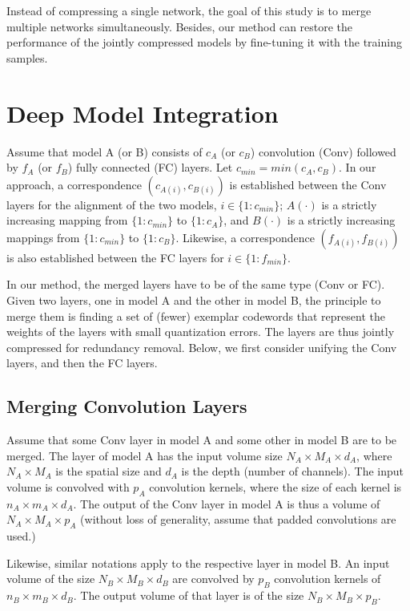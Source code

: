\documentclass{article}
\begin{document}
	
	Instead of compressing a single network, the goal of this study is to merge multiple networks simultaneously.
	Besides, our method can restore the performance of the jointly compressed models by fine-tuning it with the training samples.
	
	
	\section{Deep Model Integration}
	Assume that model A (or B) consists of $c_A$ (or $c_B$) convolution (Conv) followed by $f_A$ (or $f_B$) fully connected (FC) layers.
	Let $c_{min}=min(c_A,c_B)$.
	In our approach, a correspondence $(c_{A(i)},c_{B(i)})$ is established between the Conv layers for the alignment of the two models, $i \in \{1:c_{min}\}$; $A(\cdot)$ is a strictly increasing mapping from $\{1:c_{min}\}$ to $\{1:c_A\}$, and $B(\cdot)$ is a strictly increasing mappings from $\{1:c_{min}\}$ to $\{1:c_B\}$.
	Likewise, a correspondence $(f_{A(i)},f_{B(i)})$ is also established between the FC layers for $i \in \{1:f_{min}\}$.
	
	In our method, the merged layers have to be of the same type (Conv or FC).
	Given two layers, one in model A and the other in model B, the principle to merge them is finding a set of (fewer) exemplar codewords that represent the weights of the layers with small quantization errors.
	The layers are thus jointly compressed for redundancy removal.
	Below, we first consider unifying the Conv layers, and then the FC layers.
	
	\subsection{Merging Convolution Layers}
	
	Assume that some Conv layer in model A and some other in model B are to be merged.
	The layer of model A has the input volume size $N_A \times M_A \times d_A$, where $N_A\times M_A$ is the spatial size and $d_A$ is the depth (number of channels).
	The input volume is convolved with $p_A$ convolution kernels, where the size of each kernel is $n_A \times m_A \times d_A$.
	The output of the Conv layer in model A is thus a volume of $N_A \times M_A \times p_A$ (without loss of generality, assume that padded convolutions are used.)
	
	Likewise, similar notations apply to the respective layer in model B.
	An input volume of the size $N_B \times M_B \times d_B$ are convolved by $p_B$ convolution kernels of $n_B \times m_B \times d_B$.
	The output volume of that layer is of the size $N_B \times M_B \times p_B$.
	
\end{document}
